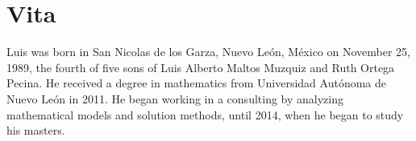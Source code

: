 \chapter{Vita}
Luis was born in San Nicolas de los Garza,
Nuevo León, México
on November 25, 1989,
the fourth of five sons of
Luis Alberto Maltos Muzquiz and Ruth Ortega Pecina.
He received a degree in mathematics
from Universidad Autónoma de Nuevo León in 2011.
He began working in a consulting
by analyzing mathematical models
and solution methods,
until 2014,
when he began to study his masters.
